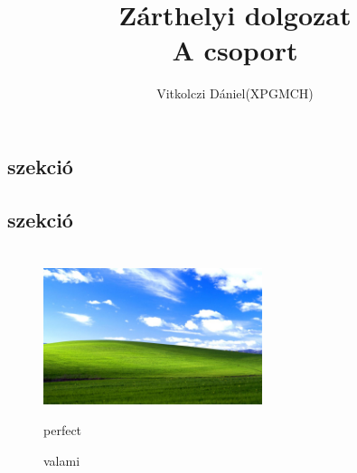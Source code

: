 \documentclass[11pt]{book}
\title{Zárthelyi dolgozat\\ \small{A csoport}}
\author{Vitkolczi Dániel(XPGMCH)}
\begin{document}
\maketitle
\pagestyle{fancy}
\fancyhead[RO]{\thesection}
\fancyhead[LE]{\thechapter}
\fancyfoot[RO, LE]{\thepage}
\fancyfoot[C]{}
\chapter{}
\section{szekció}
\hulipsum[1-2]
\section{szekció}
\hulipsum[3-4]

\newpage
\chapter{}
\begin{figure}
\centering
\includegraphics[height=4cm, scale=0.5]{szines}
\caption{perfect}
\setlength{\fboxsep}{0pt}
\caption{valami}
\end{figure}
\hulipsum[1-2]

\newpage
\end{document}
